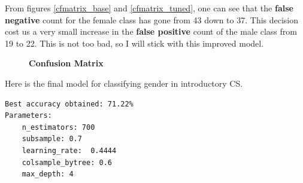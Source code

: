 From figures \ref{cfmatrix_base} and \ref{cfmatrix_tuned}, one can see that the \textbf{false negative} count for the female class has gone from 43 down to 37. This decision cost us a very small increase in the \textbf{false positive} count of the male class from 19 to 22. This is not too bad, so I will stick with this improved model.

\begin{figure}[!hbtp]
\centering

    \caption{\textbf{Confusion Matrix}}
\end{figure}

Here is the final model for classifying gender in introductory CS. 
\begin{verbatim}
Best accuracy obtained: 71.22%
Parameters:
    n_estimators: 700
    subsample: 0.7
    learning_rate:  0.4444
    colsample_bytree: 0.6
    max_depth: 4

\end{verbatim}


